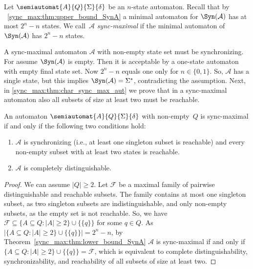 
Let $\semiautomat{A}{Q}{\Sigma}{\delta}$ be an $n$-state automaton.
Recall that by \THM~\ref{sync_max:thm:upper_bound_SynA} 
a minimal automaton for $\Syn(\mathcal A)$ has at most $2^n - n$ states. %
We call~$\mathcal A$ %
\emph{sync-maximal} if the minimal automaton of $\Syn(\mathcal A)$ 
has $2^n - n$ states.

A sync-maximal automaton $\mathcal A$ with non-empty state set must be synchronizing.
For assume $\Syn(\mathcal A)$ is empty.
Then it is acceptable by a one-state automaton with empty final state set.
Now $2^n - n$ equals one only for $n \in \{0,1\}$.
So, $\mathcal A$ has a single state,
but this implies $\Syn(\mathcal A) = \Sigma^*$, contradicting the assumption.
Next, in \cref{sync_max:thm:char_sync_max_aut} 
we prove that in a sync-maximal automaton also all subsets of size at least two must be reachable.

\begin{theorem}
	\label{sync_max:thm:char_sync_max_aut}
	An automaton $\semiautomat{A}{Q}{\Sigma}{\delta}$ with non-empty~$Q$
	is sync-maximal if and only if the following two conditions
	hold:
	\begin{enumerate} 
		\item \label{sync_max:thm:char_sync_max_aut:1} $\mathcal A$ is synchronizing (i.e., at least one singleton subset
		is reachable) %
		and every non-empty subset with at least two states is reachable.
		
		\item $\mathcal A$ is completely distinguishable.
	\end{enumerate}
\end{theorem}
\begin{proof}
	We can assume $|Q| \ge 2$. Let $\mathcal F$ be a maximal family of pairwise distinguishable and reachable subsets. 
	The family contains at most one singleton subset, as two singleton subsets are indistinguishable,
	and only non-empty subsets, as the empty set is not reachable. So, we have $\mathcal F \subseteq \{ A \subseteq Q : |A| \ge 2 \} \cup \{\{q\}\}$
	for some $q \in Q$.	As $| \{ A \subseteq Q : |A| \ge 2 \} \cup \{\{q\}\} | = 2^n  - n$,
	by Theorem~\ref{sync_max:thm:lower_bound_SynA} $\mathcal A$ is sync-maximal
	if and only if $\{ A \subseteq Q : |A| \ge 2 \} \cup \{\{q\}\} = \mathcal F$,
	which is equivalent to complete distinguishability, synchronizability,
	and reachability of all subsets of size at least two.
\end{proof}

